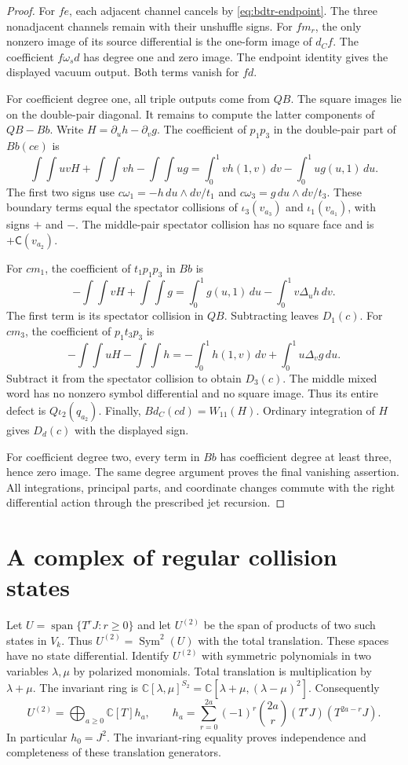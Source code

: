 \begin{proof}
For $fe$, each adjacent channel cancels by \eqref{eq:bdtr-endpoint}.
The three nonadjacent channels remain with their unshuffle signs.
For $fm_r$, the only nonzero image of its source differential is the one-form image of $d_Cf$.
The coefficient $f\omega_sd$ has degree one and zero image.
The endpoint identity gives the displayed vacuum output.
Both terms vanish for $fd$.

For coefficient degree one, all triple outputs come from $QB$.
The square images lie on the double-pair diagonal.
It remains to compute the latter components of $QB-Bb$.
Write $H=\partial_uh-\partial_vg$.
The coefficient of $p_1p_3$ in the double-pair part of $Bb(ce)$ is
\[
 \int\!\int uvH+\int\!\int vh-\int\!\int ug
 =\int_0^1vh(1,v)\,dv-\int_0^1ug(u,1)\,du.
\]
The first two signs use $c\omega_1=-h\,du\wedge dv/t_1$ and
$c\omega_3=g\,du\wedge dv/t_3$.
These boundary terms equal the spectator collisions of $\iota_3(v_{a_3})$ and $\iota_1(v_{a_1})$, with signs $+$ and $-$.
The middle-pair spectator collision has no square face and is $+\mathsf C(v_{a_2})$.

For $cm_1$, the coefficient of $t_1p_1p_3$ in $Bb$ is
\[
 -\int\!\int vH+\int\!\int g
 =\int_0^1g(u,1)\,du-\int_0^1v\Delta_uh\,dv.
\]
The first term is its spectator collision in $QB$.
Subtracting leaves $D_1(c)$.
For $cm_3$, the coefficient of $p_1t_3p_3$ is
\[
 -\int\!\int uH-\int\!\int h
 =-\int_0^1h(1,v)\,dv+\int_0^1u\Delta_vg\,du.
\]
Subtract it from the spectator collision to obtain $D_3(c)$.
The middle mixed word has no nonzero symbol differential and no square image.
Thus its entire defect is $Q\iota_2(q_{a_2})$.
Finally, $Bd_C(cd)=W_{11}(H)$.
Ordinary integration of $H$ gives $D_d(c)$ with the displayed sign.

For coefficient degree two, every term in $Bb$ has coefficient degree at least three, hence zero image.
The same degree argument proves the final vanishing assertion.
All integrations, principal parts, and coordinate changes commute with the right differential action through the prescribed jet recursion.
\end{proof}

\section{A complex of regular collision states}

Let $U=\operatorname{span}\{T^rJ:r\geq0\}$ and let $U^{(2)}$ be the span of products of two such states in $V_k$.
Thus $U^{(2)}=\operatorname{Sym}^2(U)$ with the total translation.
These spaces have no state differential.
Identify $U^{(2)}$ with symmetric polynomials in two variables $\lambda,\mu$ by polarized monomials.
Total translation is multiplication by $\lambda+\mu$.
The invariant ring is
$\mathbb C[\lambda,\mu]^{S_2}=\mathbb C[\lambda+\mu,(\lambda-\mu)^2]$.
Consequently
\begin{equation}\label{eq:bdfour-quadratic-basis}
 U^{(2)}=\bigoplus_{a\geq0}\mathbb C[T]h_a,
 \qquad
 h_a=\sum_{r=0}^{2a}(-1)^r\binom{2a}{r}(T^rJ)(T^{2a-r}J).
\end{equation}
In particular $h_0=J^2$.
The invariant-ring equality proves independence and completeness of these translation generators.

